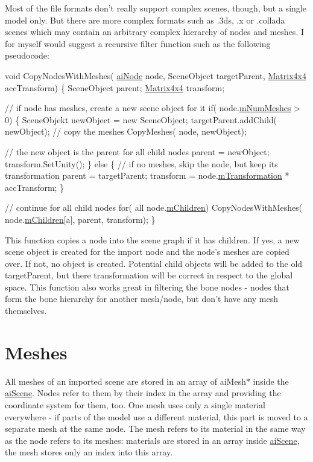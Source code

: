 Most of the file formats don't really support complex scenes, though, but a single model only. But there are more complex formats such as .3ds, .x or .collada scenes which may contain an arbitrary complex hierarchy of nodes and meshes. I for myself would suggest a recursive filter function such as the following pseudocode\+:


\begin{DoxyCode}
\textcolor{keywordtype}{void} CopyNodesWithMeshes( \hyperlink{structai_node}{aiNode} node, SceneObject targetParent, \hyperlink{class_matrix4x4}{Matrix4x4} accTransform)
\{
  SceneObject parent;
  \hyperlink{class_matrix4x4}{Matrix4x4} transform;

  \textcolor{comment}{// if node has meshes, create a new scene object for it}
  \textcolor{keywordflow}{if}( node.\hyperlink{structai_node_a7a411079096f86d1e96b6368d237d897}{mNumMeshes} > 0)
  \{
    SceneObjekt newObject = \textcolor{keyword}{new} SceneObject;
    targetParent.addChild( newObject);
    \textcolor{comment}{// copy the meshes}
    CopyMeshes( node, newObject);

    \textcolor{comment}{// the new object is the parent for all child nodes}
    parent = newObject;
    transform.SetUnity();
  \} \textcolor{keywordflow}{else}
  \{
    \textcolor{comment}{// if no meshes, skip the node, but keep its transformation}
    parent = targetParent;
    transform = node.\hyperlink{structai_node_aadb69c766c7658bba9d2195af16d6831}{mTransformation} * accTransform;
  \}

  \textcolor{comment}{// continue for all child nodes}
  \textcolor{keywordflow}{for}( all node.\hyperlink{structai_node_ac700679f0d4971f124e8444f68057291}{mChildren})
    CopyNodesWithMeshes( node.\hyperlink{structai_node_ac700679f0d4971f124e8444f68057291}{mChildren}[a], parent, transform);
\}
\end{DoxyCode}


This function copies a node into the scene graph if it has children. If yes, a new scene object is created for the import node and the node's meshes are copied over. If not, no object is created. Potential child objects will be added to the old target\+Parent, but there transformation will be correct in respect to the global space. This function also works great in filtering the bone nodes -\/ nodes that form the bone hierarchy for another mesh/node, but don't have any mesh themselves.\hypertarget{data_meshes}{}\section{Meshes}\label{data_meshes}
All meshes of an imported scene are stored in an array of ai\+Mesh$\ast$ inside the \hyperlink{structai_scene}{ai\+Scene}. Nodes refer to them by their index in the array and providing the coordinate system for them, too. One mesh uses only a single material everywhere -\/ if parts of the model use a different material, this part is moved to a separate mesh at the same node. The mesh refers to its material in the same way as the node refers to its meshes\+: materials are stored in an array inside \hyperlink{structai_scene}{ai\+Scene}, the mesh stores only an index into this array.

